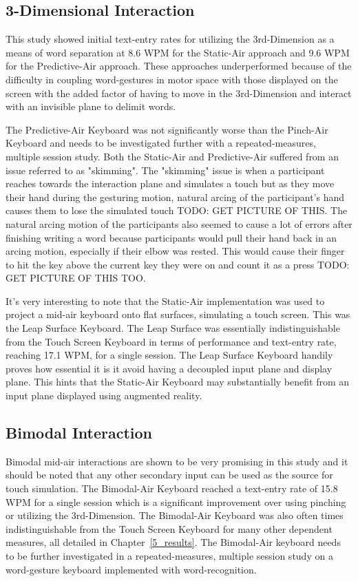 \subsection{3-Dimensional Interaction}
This study showed initial text-entry rates for utilizing the 3rd-Dimension as a means of word separation at 8.6 WPM for the Static-Air approach and 9.6 WPM for the Predictive-Air approach. These approaches underperformed because of the difficulty in coupling word-gestures in motor space with those displayed on the screen with the added factor of having to move in the 3rd-Dimension and interact with an invisible plane to delimit words.

The Predictive-Air Keyboard was not significantly worse than the Pinch-Air Keyboard and needs to be investigated further with a repeated-measures, multiple session study. Both the Static-Air and Predictive-Air suffered from an issue referred to as "skimming". The "skimming" issue is when a participant reaches towards the interaction plane and simulates a touch but as they move their hand during the gesturing motion, natural arcing of the participant's hand causes them to lose the simulated touch TODO: GET PICTURE OF THIS. The natural arcing motion of the participants also seemed to cause a lot of errors after finishing writing a word because participants would pull their hand back in an arcing motion, especially if their elbow was rested. This would cause their finger to hit the key above the current key they were on and count it as a press TODO: GET PICTURE OF THIS TOO.

It's very interesting to note that the Static-Air implementation was used to project a mid-air keyboard onto flat surfaces, simulating a touch screen. This was the Leap Surface Keyboard. The Leap Surface was essentially indistinguishable from the Touch Screen Keyboard in terms of performance and text-entry rate, reaching 17.1 WPM, for a single session. The Leap Surface Keyboard handily proves how essential it is it avoid having a decoupled input plane and display plane. This hints that the Static-Air Keyboard may substantially benefit from an input plane displayed using augmented reality.

\subsection{Bimodal Interaction}
Bimodal mid-air interactions are shown to be very promising in this study and it should be noted that any other secondary input can be used as the source for touch simulation. The Bimodal-Air Keyboard reached a text-entry rate of 15.8 WPM for a single session which is a significant improvement over using pinching or utilizing the 3rd-Dimension. The Bimodal-Air Keyboard was also often times indistinguishable from the Touch Screen Keyboard for many other dependent measures, all detailed in Chapter~\ref{5_results}. The Bimodal-Air keyboard needs to be further investigated in a repeated-measures, multiple session study on a word-gesture keyboard implemented with word-recognition.

